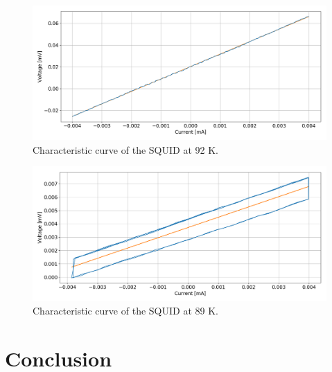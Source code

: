 \documentclass[a4paper,10pt]{article}
\begin{document}
\begin{figure}[H]
\centering
\includegraphics[width = \textwidth]{92K}
\caption{Characteristic curve of the SQUID at 92 K.}\label{92}
\end{figure}
\begin{figure}[H]
\centering
\includegraphics[width = \textwidth]{89K}
\caption{Characteristic curve of the SQUID at 89 K.}\label{89}
\end{figure}
\section{Conclusion}
\end{document}
